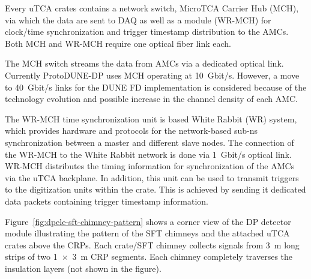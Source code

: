 Every uTCA crates contains a network switch, MicroTCA Carrier Hub (MCH), via which the data are sent to DAQ as well as a module (WR-MCH) for clock/time synchronization and trigger timestamp distribution to the AMCs. Both MCH and WR-MCH require one optical fiber link each. 

The MCH switch streams the data from AMCs via a dedicated optical link. Currently ProtoDUNE-DP uses MCH operating at \SI{10}{Gbit/s}. However, a move to \SI{40}{Gbit/s} links for the DUNE FD implementation is considered because of the technology evolution and possible increase in the channel density of each AMC.

The WR-MCH time synchronization unit is based White Rabbit (WR) system, which provides hardware and protocols for the network-based sub-ns synchronization between a master and different slave nodes. The connection of the WR-MCH to the White Rabbit network is done via \SI{1}{Gbit/s} optical link. WR-MCH distributes the timing information for synchronization of the AMCs via the uTCA backplane. In addition, this unit can be used to transmit triggers to the digitization units within the crate. This is achieved by sending it dedicated data packets containing trigger timestamp information. 

Figure~\ref{fig:dpele-sft-chimney-pattern} shows a corner view of the DP detector module illustrating the pattern of the SFT chimneys and the attached uTCA crates above the CRPs. Each crate/SFT chimney collects signals from \SI{3}{\meter} long strips of two \SI[product-units=power]{1x3}{\meter} CRP segments. Each chimney completely traverses the insulation layers (not shown in the figure). 


